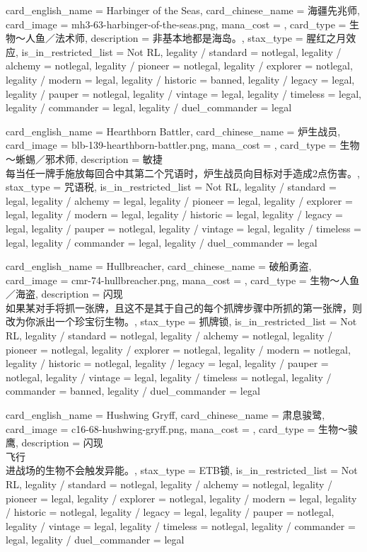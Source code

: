 \documentclass[lang = cn, color = black, 10pt]{AllThatStax}
\begin{document}
\card
{
	card_english_name = {Harbinger of the Seas},
	card_chinese_name = {海疆先兆师},
	card_image = mh3-63-harbinger-of-the-seas.png,
	mana_cost = ,
	card_type = 生物～人鱼／法术师,
	description = {非基本地都是海岛。},
	stax_type = 腥红之月效应,
	is_in_restricted_list = Not RL,
	legality / standard = notlegal,
	legality / alchemy = notlegal,
	legality / pioneer = notlegal,
	legality / explorer = notlegal,
	legality / modern = legal,
	legality / historic = banned,
	legality / legacy = legal,
	legality / pauper = notlegal,
	legality / vintage = legal,
	legality / timeless = legal,
	legality / commander = legal,
	legality / duel_commander = legal
}

\card
{
	card_english_name = {Hearthborn Battler},
	card_chinese_name = {炉生战员},
	card_image = blb-139-hearthborn-battler.png,
	mana_cost = ,
	card_type = 生物～蜥蜴／邪术师,
	description = {敏捷\\
每当任一牌手施放每回合中其第二个咒语时，炉生战员向目标对手造成2点伤害。},
	stax_type = 咒语税,
	is_in_restricted_list = Not RL,
	legality / standard = legal,
	legality / alchemy = legal,
	legality / pioneer = legal,
	legality / explorer = legal,
	legality / modern = legal,
	legality / historic = legal,
	legality / legacy = legal,
	legality / pauper = notlegal,
	legality / vintage = legal,
	legality / timeless = legal,
	legality / commander = legal,
	legality / duel_commander = legal
}

\card
{
	card_english_name = {Hullbreacher},
	card_chinese_name = {破船勇盗},
	card_image = cmr-74-hullbreacher.png,
	mana_cost = ,
	card_type = 生物～人鱼／海盗,
	description = {闪现\\
如果某对手将抓一张牌，且这不是其于自己的每个抓牌步骤中所抓的第一张牌，则改为你派出一个珍宝衍生物。},
	stax_type = 抓牌锁,
	is_in_restricted_list = Not RL,
	legality / standard = notlegal,
	legality / alchemy = notlegal,
	legality / pioneer = notlegal,
	legality / explorer = notlegal,
	legality / modern = notlegal,
	legality / historic = notlegal,
	legality / legacy = legal,
	legality / pauper = notlegal,
	legality / vintage = legal,
	legality / timeless = notlegal,
	legality / commander = banned,
	legality / duel_commander = legal
}

\card
{
	card_english_name = {Hushwing Gryff},
	card_chinese_name = {肃息骏鹭},
	card_image = c16-68-hushwing-gryff.png,
	mana_cost = ,
	card_type = 生物～骏鹰,
	description = {闪现\\
飞行\\
进战场的生物不会触发异能。},
	stax_type = ETB锁,
	is_in_restricted_list = Not RL,
	legality / standard = notlegal,
	legality / alchemy = notlegal,
	legality / pioneer = legal,
	legality / explorer = notlegal,
	legality / modern = legal,
	legality / historic = notlegal,
	legality / legacy = legal,
	legality / pauper = notlegal,
	legality / vintage = legal,
	legality / timeless = notlegal,
	legality / commander = legal,
	legality / duel_commander = legal
}
\end{document}
